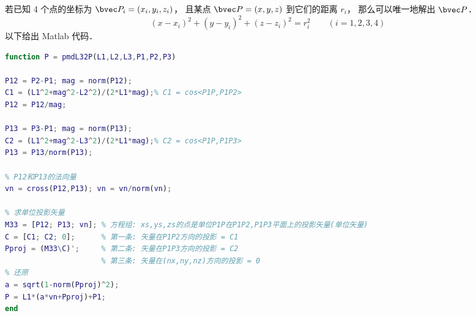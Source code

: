 
\begin{issues}
\issueDraft
\end{issues}

若已知 4 个点的坐标为 $\bvec P_i = (x_i,y_i,z_i)$， 且某点 $\bvec P = (x,y,z)$ 到它们的距离 $r_i$， 那么可以唯一地解出 $\bvec P$．
\begin{equation}
(x-x_i)^2 + (y-y_i)^2 + (z-z_i)^2 = r_i^2 \qquad (i = 1,2,3,4)
\end{equation}
以下给出 Matlab 代码．

\begin{lstlisting}[language=matlab]
% 已知三棱锥底面的三个点坐标 P1,P2,P3, 和三条棱 L1,L2,L3, 求顶点坐标
function P = pmdL32P(L1,L2,L3,P1,P2,P3)

P12 = P2-P1; mag = norm(P12);
C1 = (L1^2+mag^2-L2^2)/(2*L1*mag);% C1 = cos<P1P,P1P2>
P12 = P12/mag;

P13 = P3-P1; mag = norm(P13);
C2 = (L1^2+mag^2-L3^2)/(2*L1*mag);% C2 = cos<P1P,P1P3>
P13 = P13/norm(P13);

% P12和P13的法向量
vn = cross(P12,P13); vn = vn/norm(vn);

% 求单位投影矢量
M33 = [P12; P13; vn]; % 方程组: xs,ys,zs的点是单位P1P在P1P2,P1P3平面上的投影矢量(单位矢量)
C = [C1; C2; 0];      % 第一条: 矢量在P1P2方向的投影 = C1
Pproj = (M33\C)';     % 第二条: 矢量在P1P3方向的投影 = C2
                      % 第三条: 矢量在(nx,ny,nz)方向的投影 = 0
% 还原
a = sqrt(1-norm(Pproj)^2);
P = L1*(a*vn+Pproj)+P1;
end
\end{lstlisting}

